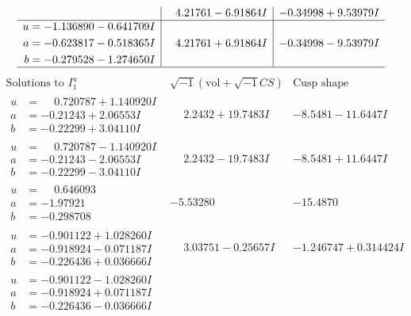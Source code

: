 \documentclass[1p]{elsarticle_modified}
\theoremstyle{definition}
\newcommand{\I}{\sqrt{-1}}
\begin{document}
$$\begin{array}{c|c|c}
 & \phantom{-}4.21761 - 6.91864 I & -0.34998 + 9.53979 I \\ \hline\begin{aligned}
u &= -1.136890 - 0.641709 I \\
a &= -0.623817 - 0.518365 I \\
b &= -0.279528 - 1.274650 I\end{aligned}
 & \phantom{-}4.21761 + 6.91864 I & -0.34998 - 9.53979 I\\
 \hline 
 \end{array}$$\newpage$$\begin{array}{c|c|c}  
\text{Solutions to }I^u_{1}& \I (\text{vol} + \sqrt{-1}CS) & \text{Cusp shape}\\
 \hline 
\begin{aligned}
u &= \phantom{-}0.720787 + 1.140920 I \\
a &= -0.21243 + 2.06553 I \\
b &= -0.22299 + 3.04110 I\end{aligned}
 & \phantom{-}2.2432 + 19.7483 I & -8.5481 - 11.6447 I \\ \hline\begin{aligned}
u &= \phantom{-}0.720787 - 1.140920 I \\
a &= -0.21243 - 2.06553 I \\
b &= -0.22299 - 3.04110 I\end{aligned}
 & \phantom{-}2.2432 - 19.7483 I & -8.5481 + 11.6447 I \\ \hline\begin{aligned}
u &= \phantom{-}0.646093\phantom{ +0.000000I} \\
a &= -1.97921\phantom{ +0.000000I} \\
b &= -0.298708\phantom{ +0.000000I}\end{aligned}
 & -5.53280\phantom{ +0.000000I} & -15.4870\phantom{ +0.000000I} \\ \hline\begin{aligned}
u &= -0.901122 + 1.028260 I \\
a &= -0.918924 - 0.071187 I \\
b &= -0.226436 + 0.036666 I\end{aligned}
 & \phantom{-}3.03751 - 0.25657 I & -1.246747 + 0.314424 I \\ \hline\begin{aligned}
u &= -0.901122 - 1.028260 I \\
a &= -0.918924 + 0.071187 I \\
b &= -0.226436 - 0.036666 I\end{aligned}

\end{array}$$
\end{document}
